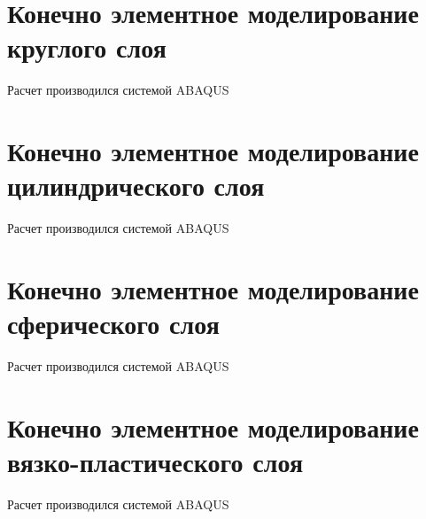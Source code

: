 \chapter{Конечно элементное моделирование круглого слоя}\label{app:A}

Расчет производился системой ABAQUS

\chapter{Конечно элементное моделирование цилиндрического слоя}\label{app:B}

Расчет производился системой ABAQUS

\chapter{Конечно элементное моделирование сферического слоя}\label{app:C}

Расчет производился системой ABAQUS

\chapter{Конечно элементное моделирование вязко-пластического слоя}\label{app:D}

Расчет производился системой ABAQUS